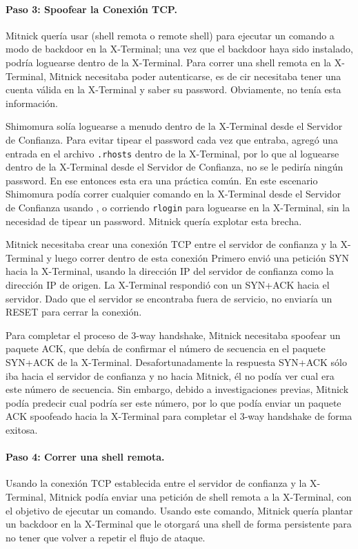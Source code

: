 \paragraph{Paso 3: Spoofear la Conexión TCP.}
Mitnick quería usar \rsh (shell remota o remote shell) para ejecutar un comando a modo de backdoor en la X-Terminal; una vez que el backdoor haya sido instalado, podría loguearse dentro de la X-Terminal.
Para correr una shell remota en la X-Terminal, Mitnick necesitaba poder autenticarse, es de cir necesitaba tener una cuenta válida en la X-Terminal y saber su password. Obviamente, no tenía esta información.

Shimomura solía loguearse a menudo dentro de la X-Terminal desde el Servidor de Confianza. Para evitar tipear el password cada vez que entraba, agregó una entrada en el archivo \texttt{.rhosts}  dentro de la X-Terminal, por lo que al loguearse dentro de la X-Terminal desde el Servidor de Confianza, no se le pediría ningún password. En ese entonces esta era una práctica común. En este escenario Shimomura podía correr cualquier comando en la X-Terminal desde el Servidor de Confianza usando \rsh, o corriendo \texttt{rlogin} para loguearse en la X-Terminal, sin la necesidad de tipear un password.
Mitnick quería explotar esta brecha.

Mitnick necesitaba crear una conexión TCP entre el servidor de confianza y la X-Terminal y luego correr  \rsh dentro de esta conexión
Primero envió una petición SYN hacia la X-Terminal, usando la dirección IP del servidor de confianza como la dirección IP de origen.
La X-Terminal respondió con un SYN+ACK hacia el servidor. Dado que el servidor se encontraba fuera de servicio, no enviaría un RESET para cerrar la conexión. 

Para completar el proceso de 3-way handshake, Mitnick necesitaba spoofear un paquete ACK, que debía de confirmar el número de secuencia en el paquete SYN+ACK de la X-Terminal. Desafortunadamente la respuesta SYN+ACK sólo iba hacia el servidor de confianza y no hacia Mitnick, él no podía ver cual era este número de secuencia. Sin embargo, debido a investigaciones previas, Mitnick podía predecir cual podría ser este número, por lo que podía enviar un paquete ACK spoofeado hacia la X-Terminal para completar el 3-way handshake de forma exitosa.


\paragraph{Paso 4: Correr una shell remota.} 
Usando la conexión TCP establecida entre el servidor de confianza y la X-Terminal, Mitnick podía enviar una petición de shell remota a la X-Terminal, con el objetivo de ejecutar un comando. Usando este comando, Mitnick quería plantar un backdoor en la X-Terminal que le otorgará una shell de forma persistente para no tener que volver a repetir el flujo de ataque.

